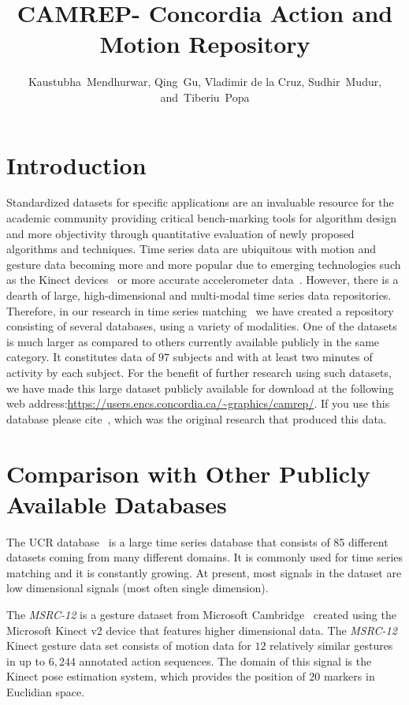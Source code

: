 \documentclass[jou,apacite]{apa6}
\title{CAMREP- Concordia Action and Motion Repository}
\author{Kaustubha~Mendhurwar,
        Qing~Gu,
        Vladimir de la Cruz,
        Sudhir~Mudur,
        and~Tiberiu~Popa}
\affiliation{Concordia University, Montreal, Quebec, Canada 
}
\begin{document}
\maketitle    
  
\section{Introduction}

Standardized datasets for specific applications are an invaluable resource for the academic community providing critical bench-marking tools for algorithm design and more objectivity through quantitative evaluation of newly proposed algorithms and techniques. 
Time series data are ubiquitous with motion and gesture data becoming more and more popular due to emerging technologies such as the Kinect devices~\cite{Kin} or more accurate accelerometer data~\cite{Myo}. However, there is a dearth of large, high-dimensional and multi-modal time series data repositories. 
Therefore, in our research in time series matching~\cite{Kaus} we have created a repository consisting of several databases, using a variety of modalities. One of the datasets is much larger as compared to others currently available publicly in the same category. It constitutes data of $97$ subjects and with at least two minutes of activity by each subject. 
For the benefit of further research using such datasets, we have made this large dataset publicly available for download at the following web address:\url{https://users.encs.concordia.ca/~graphics/camrep/}. If you use this database please cite~\cite{Kaus}, which was the original research that produced this data. 

\section{Comparison with Other Publicly Available Databases}

The UCR database~\cite{UCRArchive} is a large time series database that consists of 85 different datasets coming from many different domains. It is commonly used for time series matching and it is constantly growing. At present, most signals in the dataset are low dimensional signals (most often single dimension).   

The \textit{MSRC-12} is a gesture dataset from Microsoft Cambridge~\cite{msrc12} created using the Microsoft Kinect v2 device that features higher dimensional data. The \textit{MSRC-12} Kinect gesture data set consists of
motion data for $12$ relatively similar gestures in up to $6,244$ annotated action sequences.
The domain of this signal is the Kinect pose estimation system, which provides the position of $20$ markers in Euclidian space.
\end{document}
